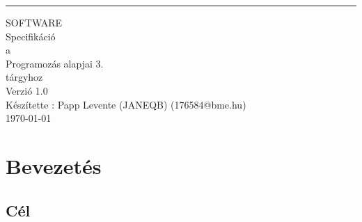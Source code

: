 \documentclass{scrreprt}
\date{}
\def\myversion{1.0 }
\begin{document}
    \begin{flushright}
        \rule{16cm}{5pt}\vskip1cm
        \begin{bfseries}
            \Huge{SOFTWARE\\ Specifikáció}\\
            \vspace{1.5cm}
            a\\
            \vspace{1.5cm}
            Programozás alapjai 3.\\
            \vspace{1.5cm}
            tárgyhoz\\
            \vspace{1.5cm}
            \LARGE{Verzió \myversion}\\
            \vspace{1.5cm}
            Készítette : Papp Levente (JANEQB) (176584@bme.hu)\\

            \vspace{1.5cm}
            \today\\
        \end{bfseries}
    \end{flushright}

    \tableofcontents

    \chapter{Bevezetés}
        \section{Cél}
            
\end{document}
